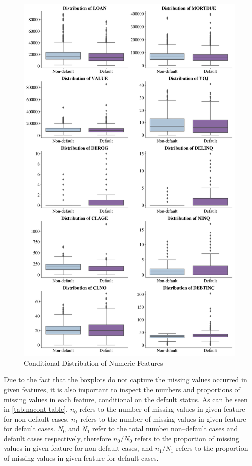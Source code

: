 \begin{figure}[H]
\centering
\caption{Conditional Distribution of Numeric Features}\vspace{0.5em}
\label{fig:boxfeat}
\includegraphics[width=140mm]{Figures/Numeric_Features_Distribution_Boxplots.jpg}

\vspace{-1em}
\end{figure}

Due to the fact that the boxplots do not capture the missing values occurred in given features, it is also important to inspect the numbers and proportions of missing values in each feature, conditional on the default status.
As can be seen in \autoref{tab:nacont-table}, $n_0$ refers to the number of missing values in given feature for non-default cases, $n_1$ refers to the number of missing values in given feature for default cases.
$N_0$ and $N_1$ refer to the total number non--default cases and default cases respectively, therefore $n_0/N_0$ refers to the proportion of missing values in given feature for non-default cases, and $n_1/N_1$ refers to the proportion of missing values in given feature for default cases.

